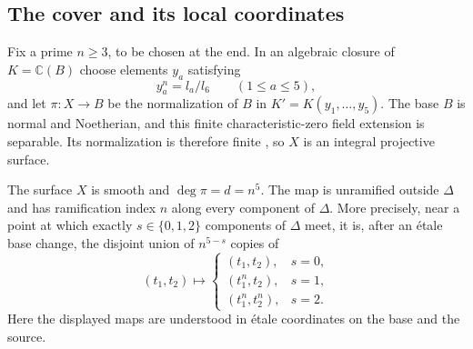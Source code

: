 \subsection{The cover and its local coordinates}

Fix a prime $n\geq3$, to be chosen at the end.  In an algebraic closure of
$K=\mathbb C(B)$ choose elements $y_a$ satisfying
\[
 y_a^n=l_a/l_6\qquad(1\leq a\leq5),
\]
and let $\pi:X\to B$ be the normalization of $B$ in
$K'=K(y_1,\ldots,y_5)$. The base $B$ is normal and Noetherian, and
this finite characteristic-zero field extension is separable.
Its normalization is therefore finite \cite[Tag~032L]{Stacks},
so $X$ is an integral projective surface.

\begin{lemma}\label{lem:cover-smooth}
The surface $X$ is smooth and $\deg\pi=d=n^5$.  The map is unramified
outside $\Delta$ and has ramification index $n$ along every component of
$\Delta$.  More precisely, near a point at which exactly $s\in\{0,1,2\}$
components of $\Delta$ meet, it is, after an \'{e}tale base change, the
disjoint union of $n^{5-s}$ copies of
\[
 (t_1,t_2)\longmapsto
 \begin{cases}
 (t_1,t_2),&s=0,\\
 (t_1^n,t_2),&s=1,\\
 (t_1^n,t_2^n),&s=2.
 \end{cases}
\]
Here the displayed maps are understood in \'{e}tale coordinates on the
base and the source.
\end{lemma}

